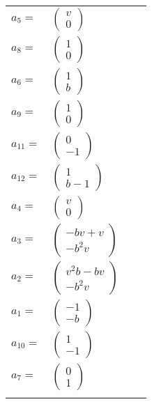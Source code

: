 \documentclass[1p]{elsarticle_modified}
\theoremstyle{definition}
\begin{document}
\begin{tabular}{m{7pt} m{180pt} m{7pt} m{180pt} }
\flushright $a_{5}=$&$\begin{pmatrix}v\\0\end{pmatrix}$ \\
\flushright $a_{8}=$&$\begin{pmatrix}1\\0\end{pmatrix}$ \\
\flushright $a_{6}=$&$\begin{pmatrix}1\\b\end{pmatrix}$ \\
\flushright $a_{9}=$&$\begin{pmatrix}1\\0\end{pmatrix}$ \\
\flushright $a_{11}=$&$\begin{pmatrix}0\\-1\end{pmatrix}$ \\
\flushright $a_{12}=$&$\begin{pmatrix}1\\b-1\end{pmatrix}$ \\
\flushright $a_{4}=$&$\begin{pmatrix}v\\0\end{pmatrix}$ \\
\flushright $a_{3}=$&$\begin{pmatrix}- b v+v\\- b^2 v\end{pmatrix}$ \\
\flushright $a_{2}=$&$\begin{pmatrix}v^2 b- b v\\- b^2 v\end{pmatrix}$ \\
\flushright $a_{1}=$&$\begin{pmatrix}-1\\- b\end{pmatrix}$ \\
\flushright $a_{10}=$&$\begin{pmatrix}1\\-1\end{pmatrix}$ \\
\flushright $a_{7}=$&$\begin{pmatrix}0\\1\end{pmatrix}$\\&\end{tabular}
\end{document}
